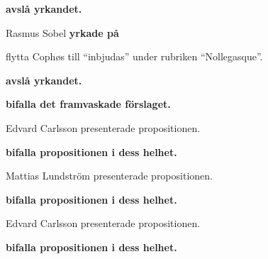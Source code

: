 \documentclass[10pt]{article}
\begin{document}
\begin{paragrafer}
\begin{paragrafer}
        \textbf{\Mba avslå yrkandet.}

        Rasmus Sobel \textbf{yrkade på}
        \begin{attsatser}
          \att flytta Cophøs till ``inbjudas'' under rubriken ``Nollegasque''.
        \end{attsatser}

        \textbf{\Mba avslå yrkandet.}





        \textbf{\Mba bifalla det framvaskade förslaget.}

      
      Edvard Carlsson presenterade propositionen. 

      \textbf{\Mba bifalla propositionen i dess helhet.}

      Mattias Lundström presenterade propositionen. 

      \textbf{\Mba bifalla propositionen i dess helhet.}


      Edvard Carlsson presenterade propositionen. 

      \textbf{\Mba bifalla propositionen i dess helhet.}



\end{paragrafer}
\end{paragrafer}
\end{document}

